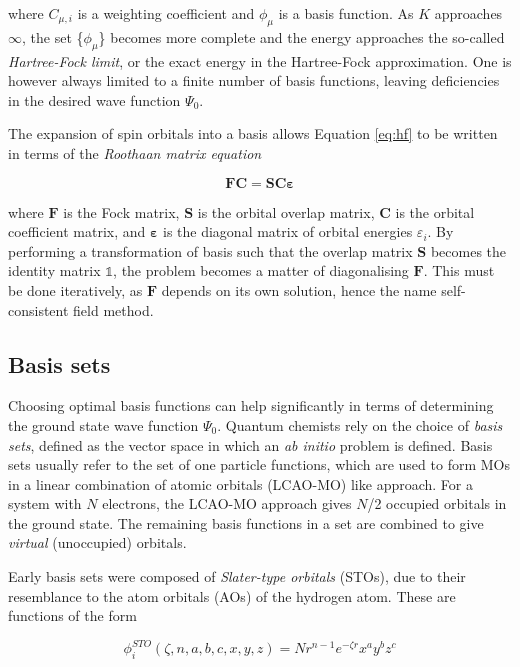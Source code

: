 \noindent where $C_{\mu,i}$ is a weighting coefficient and $\phi_{\mu}$ is a
basis function. As $K$ approaches $\infty$, the set \{$\phi_{\mu}$\} becomes more
complete and the energy approaches the so-called \emph{Hartree-Fock limit}, or the
exact energy in the Hartree-Fock approximation. One is however always limited
to a finite number of basis functions, leaving deficiencies in the desired
wave function $\Psi_0$.

The expansion of spin orbitals into a basis allows Equation \ref{eq:hf} to be
written in terms of the \emph{Roothaan matrix equation}

\begin{equation}
\mathbf{F}\mathbf{C} = \mathbf{S}\mathbf{C}\mathbf{\varepsilon}
\label{eq:roothan}
\end{equation}

\noindent where $\mathbf{F}$ is the Fock matrix, $\mathbf{S}$ is the orbital
overlap matrix, $\mathbf{C}$ is the orbital coefficient matrix, and
$\mathbf{\varepsilon}$ is the diagonal matrix of orbital energies
$\varepsilon_i$. By performing a transformation of basis such that the overlap
matrix $\mathbf{S}$ becomes the identity matrix $\mathbb{1}$, the problem
becomes a matter of diagonalising $\mathbf{F}$. This must be done iteratively,
as $\mathbf{F}$ depends on its own solution, hence the name self-consistent
field method.

\subsection{Basis sets}

Choosing optimal basis functions can help significantly in terms of determining
the ground state wave function $\Psi_0$. Quantum chemists rely on the choice of
\emph{basis sets}, defined as the vector space in which an \emph{ab initio}
problem is defined. Basis sets usually refer to the set of one particle
functions, which are used to form MOs in a linear combination of atomic orbitals
(LCAO-MO) like approach. For a system with $N$ electrons, the LCAO-MO approach
gives $N$/2 occupied orbitals in the ground state. The remaining basis functions
in a set are combined to give \emph{virtual} (unoccupied) orbitals.

Early basis sets were composed of \emph{Slater-type orbitals} (STOs), due to
their resemblance to the atom orbitals (AOs) of the hydrogen atom. These are
functions of the form

\begin{equation}
\phi_i^{STO}(\zeta,n,a,b,c,x,y,z) = Nr^{n-1}e^{-\zeta r}x^ay^bz^c
\end{equation}

